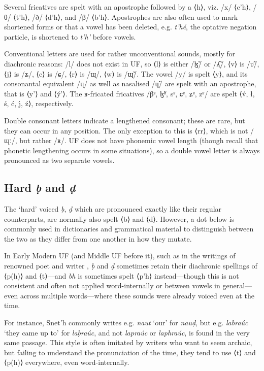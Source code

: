 \documentclass[a4paper, 12pt, twoside, openright, final]{book}
\let \w \textit
\begin{document}
Several fricatives are spelt with an apostrophe followed by a ⟨h⟩, viz. /x/ ⟨c’h⟩, /θ/ ⟨t’h⟩, /ð/ ⟨d’h⟩,
and /β/ ⟨b’h⟩. Apostrophes are also often used to mark shortened forms or that a vowel has been deleted, e.g. \w{t’hé},
the optative negation particle, is shortened to \w{t’h’} before vowels.

Conventional letters are used for rather unconventional sounds, mostly for diachronic reasons:
/l/ does not exist in UF, so ⟨l⟩ is either /ɮ̃/ or /ʎ̝̃/, ⟨v⟩ is /ʋ̃/, ⟨j⟩ is /ʑ/, ⟨c⟩ is /ɕ/, ⟨r⟩ is /ɰ/, ⟨w⟩ is /ɰ̃/. The vowel
/y/ is spelt ⟨y⟩, and its consonantal equivalent /ɥ/ as well as nasalised /ɥ̃/ are spelt with an apostrophe, that is
⟨y’⟩ and ⟨ý’⟩. The ʁ-fricated fricatives /βʶ, ɮ̃ʶ, sʶ, ɕʶ, ʑʶ, zʶ/
are spelt ⟨v́, ł, ś, ć, ȷ́, ź⟩, respectively.

Double consonant letters indicate a lengthened consonant; these are rare, but they can occur in any position. The only
exception to this is ⟨rr⟩, which is not /ɰː/, but rather /ʀ/. UF does not have phonemic vowel length (though recall
that phonetic lengthening occurs in some situations), so a double vowel letter is always pronounced as two separate vowels.

\subsection{Hard \textit{ḅ} and \textit{ḍ}}
The ‘hard’ voiced \w{ḅ}, \w{ḍ} which are pronounced exactly like their regular counterparts, are normally also spelt ⟨b⟩ and
⟨d⟩. However, a dot below is commonly used in dictionaries and grammatical material to distinguish between the two
as they differ from one another in how they mutate.

In Early Modern UF (and Middle UF before it), such as in the writings of renowned poet and writer , \w{ḅ} and \w{ḍ} sometimes retain their diachronic spellings of ⟨p(h)⟩ and ⟨t⟩—and \w{bh} is sometimes spelt
⟨p’h⟩ instead—though this is not consistent and often not applied word-internally or between vowels in general—even across multiple
words—where these sounds were already voiced even at the time.

For instance, Snet’h commonly writes e.g. \w{naut} ‘our’ for \w{nauḍ}, but e.g. \w{labraúc} ‘they came up to’ for \w{laḅraúc}, and not
\w{lapraúc} or \w{laphraúc}, is found in the very same passage. This style is often imitated by writers who want to seem archaic, but failing to
understand the pronunciation of the time, they tend to use ⟨t⟩ and ⟨p(h)⟩ everywhere, even word-internally.
\end{document}
